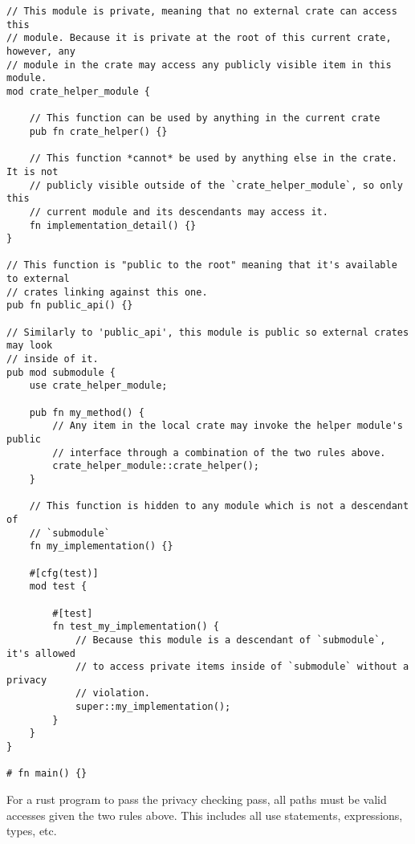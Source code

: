 \documentclass[]{article}
\begin{document}
\begin{verbatim}
// This module is private, meaning that no external crate can access this
// module. Because it is private at the root of this current crate, however, any
// module in the crate may access any publicly visible item in this module.
mod crate_helper_module {

    // This function can be used by anything in the current crate
    pub fn crate_helper() {}

    // This function *cannot* be used by anything else in the crate. It is not
    // publicly visible outside of the `crate_helper_module`, so only this
    // current module and its descendants may access it.
    fn implementation_detail() {}
}

// This function is "public to the root" meaning that it's available to external
// crates linking against this one.
pub fn public_api() {}

// Similarly to 'public_api', this module is public so external crates may look
// inside of it.
pub mod submodule {
    use crate_helper_module;

    pub fn my_method() {
        // Any item in the local crate may invoke the helper module's public
        // interface through a combination of the two rules above.
        crate_helper_module::crate_helper();
    }

    // This function is hidden to any module which is not a descendant of
    // `submodule`
    fn my_implementation() {}

    #[cfg(test)]
    mod test {

        #[test]
        fn test_my_implementation() {
            // Because this module is a descendant of `submodule`, it's allowed
            // to access private items inside of `submodule` without a privacy
            // violation.
            super::my_implementation();
        }
    }
}

# fn main() {}
\end{verbatim}

For a rust program to pass the privacy checking pass, all paths must be
valid accesses given the two rules above. This includes all use
statements, expressions, types, etc.

\end{document}
